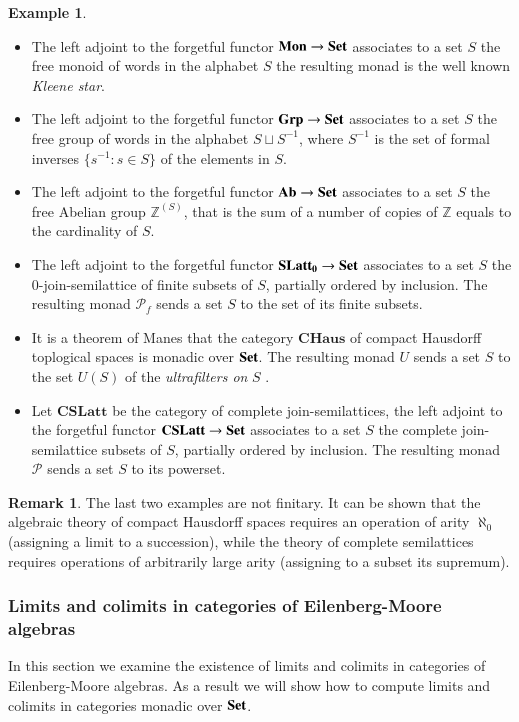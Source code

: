 \documentclass[12pt]{article}
\theoremstyle{definition}
\newtheorem{remark}[lemma]{Remark}
\newtheorem{example}[lemma]{Example}
\def\Z{\mathbb Z}
\newcommand{\Set}{\textbf{\textup{Set}}}
\newcommand{\Ab}{\textbf{\textup{Ab}}}
\newcommand{\Grp}{\textbf{\textup{Grp}}}
\newcommand{\Mon}{\textbf{\textup{Mon}}}
\newcommand{\SLatt}{\mathbf{SLatt_0}}
\newcommand{\CHaus}{\mathbf{CHaus}}
\newcommand{\CSLatt}{\mathbf{CSLatt}}
\numberwithin{equation}{section}
\begin{document}
\begin{example}\begin{itemize}
		\item The left adjoint to the forgetful functor $\Mon\rightarrow \Set$ associates to a set $S$ the free monoid of words in the alphabet $S$ the resulting monad is the well known \emph{Kleene star}.
		
		\item The left adjoint to the forgetful functor $\Grp\to \Set$ associates to a set $S$ the free group of words in the alphabet $S\sqcup S^{-1}$, where $S^{-1}$ is the set of formal inverses $\{s^{-1}:s\in S\}$ of the elements in $S$.
		\item The left adjoint to the forgetful functor $\Ab\to \Set$ associates to a set $S$ the free Abelian group $\Z^{(S)}$, that is the sum of a number of copies of $\Z$ equals to the cardinality of $S$.
		
		\item  The left adjoint to the forgetful functor $\SLatt\to \Set$ associates to a set $S$ the $0$-join-semilattice of finite subsets of $S$, partially ordered by inclusion. The resulting monad  $\mathcal{P}_f$ sends a set $S$ to the set of its finite subsets.
		
		\item It is a theorem of Manes that the category $\CHaus$ of compact Hausdorff toplogical spaces is monadic over $\Set$. The resulting monad $U$ sends a set $S$ to the set $U(S)$ of the \emph{ultrafilters on} $S$ \cite{Rich, ManAlg}. 
		
		\item Let $\CSLatt$ be the category of complete join-semilattices, the left adjoint to the forgetful functor $\CSLatt\to \Set$ associates to a set $S$ the complete join-semilattice subsets of $S$, partially ordered by inclusion. The resulting monad $\mathcal{P}$ sends a set $S$ to its powerset.
	\end{itemize}
\end{example}

\begin{remark}The last two examples are not finitary. It can be shown that the algebraic theory of compact Hausdorff spaces requires an operation of arity $\aleph_0$ (assigning a limit to a succession), while the theory of complete semilattices requires operations of arbitrarily large arity (assigning to a subset its supremum).
\end{remark}

\subsubsection{Limits and colimits in categories of Eilenberg-Moore algebras}
In this section we examine the existence of limits and colimits in categories of Eilenberg-Moore algebras. As a result we will show how to compute limits and colimits in categories monadic over $\Set$.
\end{document}
